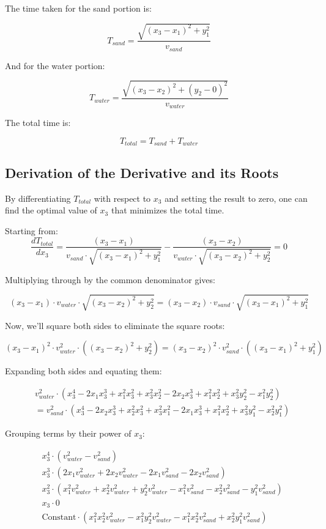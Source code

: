 \documentclass[11pt, a4paper]{article}
\begin{document}
The time taken for the sand portion is:

\[ T_{sand} = \frac{\sqrt{(x_3 - x_1)^2 + y_1^2}}{v_{sand}} \]

And for the water portion:

\[ T_{water} = \frac{\sqrt{(x_3 - x_2)^2 + (y_2 - 0)^2}}{v_{water}} \]

The total time is:

\[ T_{total} = T_{sand} + T_{water} \]


\subsection{Derivation of the Derivative and its Roots}

By differentiating \( T_{total} \) with respect to \( x_3 \) and setting the result to zero,
one can find the optimal value of \( x_3 \) that minimizes the total time.

Starting from:
\[ \frac{d T_{total}}{d x_3} = \frac{(x_3 - x_1)}{v_{sand} \cdot \sqrt{(x_3 - x_1)^2 + y_1^2}} - \frac{(x_3 - x_2)}{v_{water} \cdot \sqrt{(x_3 - x_2)^2 + y_2^2}} = 0 \]

Multiplying through by the common denominator gives:

\[ (x_3 - x_1) \cdot v_{water} \cdot \sqrt{(x_3 - x_2)^2 + y_2^2} = (x_3 - x_2) \cdot v_{sand} \cdot \sqrt{(x_3 - x_1)^2 + y_1^2} \]

Now, we'll square both sides to eliminate the square roots:

\[ (x_3 - x_1)^2 \cdot v_{water}^2 \cdot ((x_3 - x_2)^2 + y_2^2) = (x_3 - x_2)^2 \cdot v_{sand}^2 \cdot ((x_3 - x_1)^2 + y_1^2) \]



Expanding both sides and equating them:

\begin{align*}
& v_{water}^2 \cdot (x_3^4 - 2x_1x_3^3 + x_1^2x_3^2 + x_3^2x_2^2 - 2x_2x_3^3 + x_1^2x_2^2 + x_3^2y_2^2 - x_1^2y_2^2) \\
& = v_{sand}^2 \cdot (x_3^4 - 2x_2x_3^3 + x_2^2x_3^2 + x_3^2x_1^2 - 2x_1x_3^3 + x_1^2x_2^2 + x_3^2y_1^2 - x_2^2y_1^2)
\end{align*}

Grouping terms by their power of \(x_3\):

\begin{align*}
& x_3^4 \cdot (v_{water}^2 - v_{sand}^2) \\
& x_3^3 \cdot (2x_1v_{water}^2 + 2x_2v_{water}^2 - 2x_1v_{sand}^2 - 2x_2v_{sand}^2) \\
& x_3^2 \cdot (x_1^2v_{water}^2 + x_2^2v_{water}^2 + y_2^2v_{water}^2 - x_1^2v_{sand}^2 - x_2^2v_{sand}^2 - y_1^2v_{sand}^2) \\
& x_3 \cdot 0 \\
& \text{Constant} \cdot (x_1^2x_2^2v_{water}^2 - x_1^2y_2^2v_{water}^2 - x_1^2x_2^2v_{sand}^2 + x_2^2y_1^2v_{sand}^2)
\end{align*}
\end{document}

